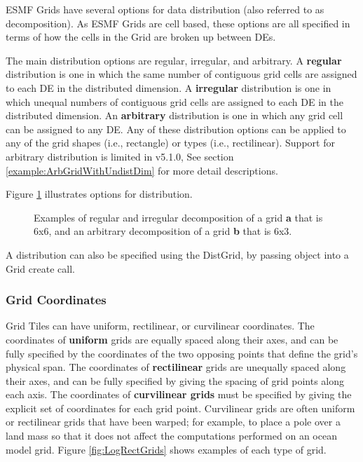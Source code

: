 ESMF Grids have several options for data distribution (also referred to
as decomposition).  As ESMF Grids are cell based, these 
options are all specified  in terms of how the cells in the Grid
are broken up between DEs. 

The main distribution options are regular, irregular, and arbitrary.
A {\bf regular} distribution is one in which the same number of
contiguous grid cells are assigned to each DE in the
distributed dimension.  A {\bf irregular} distribution is one in which
unequal numbers of contiguous grid cells are assigned to each
DE in the distributed dimension.  An {\bf arbitrary} distribution is
one in which any grid cell can be assigned to any DE.  Any of these
distribution options can be applied to any of the grid shapes (i.e.,
rectangle) or types (i.e., rectilinear).  Support for arbitrary distribution 
is limited in v5.1.0, See section \ref{example:ArbGridWithUndistDim} for
more detail descriptions.


Figure \ref{fig:GridDecomps} illustrates options for distribution.
\begin{figure}
\caption{Examples of regular and irregular decomposition of
a grid {\bf a} that is 6x6, and an arbitrary decomposition of
a grid {\bf b} that is 6x3.}
\label{fig:GridDecomps}
\end{figure}

A distribution can also be specified using the DistGrid, by passing
object into a Grid create call.

\subsubsection{Grid Coordinates}
\label{sec:coordspec}
Grid Tiles can have uniform, rectilinear, or curvilinear
coordinates.  The coordinates of {\bf uniform} grids are equally spaced along
their axes, and can be fully specified by the coordinates of the two opposing points
that define the grid's physical span.  The coordinates of {\bf rectilinear} grids
are unequally spaced along their axes, and can be fully specified by giving
the spacing of grid points along each axis.  The coordinates of {\bf curvilinear 
grids} must be specified by giving the explicit set of coordinates for each
grid point.  Curvilinear grids are often uniform or rectilinear grids that 
have been warped; for example, to place a pole over a land mass so that it
does not affect the computations performed on an ocean model grid.  Figure
\ref{fig:LogRectGrids} shows examples of each type of grid.

